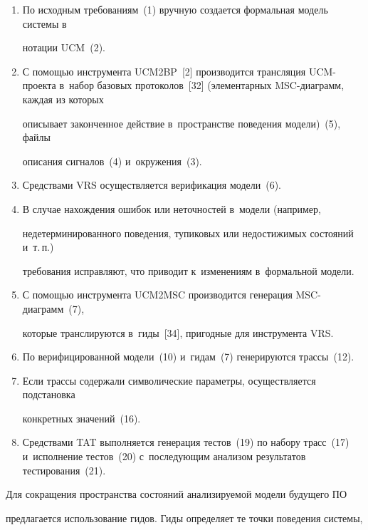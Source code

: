    \begin{enumerate}[1.]


\item По исходным требованиям~(1) вручную создается формальная модель системы в


нотации UCM~(2).


\item С помощью инструмента UCM2BP~[2] производится трансляция UCM-про\-екта в~набор базовых протоколов~[32] (элементарных MSC-диаграмм, каждая из которых


описывает законченное действие в~пространстве поведения модели)~(5), файлы


описания сигналов~(4) и~окружения~(3).


\item Средствами VRS осуществляется верификация модели~(6).


\item В случае нахождения ошибок или неточностей в~модели (например,


недетерминированного поведения, тупиковых или недостижимых состояний и~т.\,п.)


требования исправляют, что приводит к~изменениям в~формальной модели.


\item С помощью инструмента UCM2MSC производится генерация MSC-ди\-а\-грамм~(7),


которые транслируются в~гиды~[34], пригодные для инструмента VRS.


\item По верифицированной модели~(10) и~гидам~(7) генерируются трассы~(12).


\item Если трассы содержали символические параметры, осуществляется подстановка


конкретных значений~(16).


\item Средствами TAT выполняется генерация тестов~(19) по набору трасс~(17) и~исполнение тестов~(20) с~последующим анализом результатов тестирования~(21).


   \end{enumerate}





   Для сокращения пространства состояний анализируемой модели будущего ПО


предлагается использование гидов. Гиды определяет те точки поведения системы,


